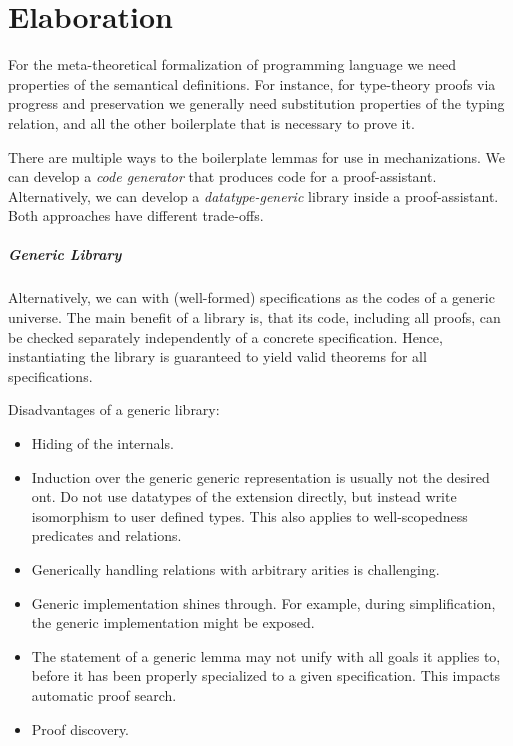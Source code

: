 \chapter{Elaboration}\label{ch:elaboration}

For the meta-theoretical formalization of programming language we need
properties of the semantical definitions. For instance, for type-theory proofs
via progress and preservation we generally need substitution properties of the
typing relation, and all the other boilerplate that is necessary to prove it.

There are multiple ways to the boilerplate lemmas for use in mechanizations. We
can develop a \emph{code generator} that produces code for a proof-assistant.
Alternatively, we can develop a \emph{datatype-generic} library inside a
proof-assistant. Both approaches have different trade-offs.


\paragraph{Generic Library}

Alternatively, we can with (well-formed) \Knot specifications as the codes of a
generic universe. The main benefit of a library is, that its code, including all
proofs, can be checked separately independently of a concrete specification.
Hence, instantiating the library is guaranteed to yield valid theorems for all
specifications.

Disadvantages of a generic library:
\begin{itemize}
\item Hiding of the internals.
\item Induction over the generic generic representation is usually not the
  desired ont. Do not use datatypes of the extension directly, but instead
  write isomorphism to user defined types. This also applies to
  well-scopedness predicates and relations.
\item Generically handling relations with arbitrary arities is challenging.
\item Generic implementation shines through. For example, during
  simplification, the generic implementation might be exposed.
\item The statement of a generic lemma may not unify with all goals it applies
  to, before it has been properly specialized to a given specification. This
  impacts automatic proof search.
\item Proof discovery.
\end{itemize}


